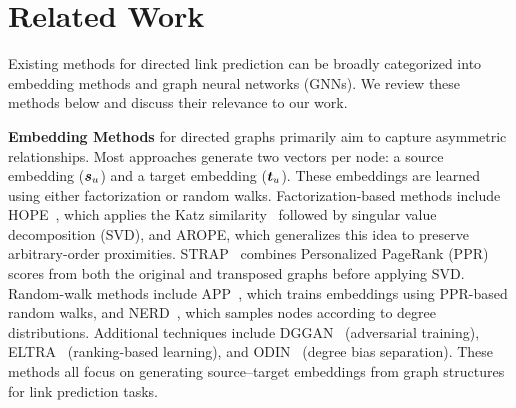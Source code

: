 \hypertarget{app:related_work}{} 
\section{Related Work}\label{app:related_work}
Existing methods for directed link prediction can be broadly categorized into embedding methods and graph neural networks (GNNs). We review these methods below and discuss their relevance to our work.

\textbf{Embedding Methods} for directed graphs primarily aim to capture asymmetric relationships. Most approaches generate two vectors per node: a source embedding (${\bm{s}}_u$) and a target embedding (${\bm{t}}_u$). These embeddings are learned using either factorization or random walks. Factorization-based methods include HOPE~\citep{hope}, which applies the Katz similarity~\cite{katz1953new} followed by singular value decomposition (SVD)\cite{golub2013matrix}, and AROPE\citep{arope}, which generalizes this idea to preserve arbitrary-order proximities. STRAP~\citep{strap} combines Personalized PageRank (PPR)~\citep{Page1999ThePC} scores from both the original and transposed graphs before applying SVD. Random-walk methods include APP~\citep{app}, which trains embeddings using PPR-based random walks, and NERD~\citep{nerd}, which samples nodes according to degree distributions. Additional techniques include DGGAN~\citep{dggan} (adversarial training), ELTRA~\citep{eltra} (ranking-based learning), and ODIN~\citep{odin} (degree bias separation). These methods all focus on generating source–target embeddings from graph structures for link prediction tasks.


